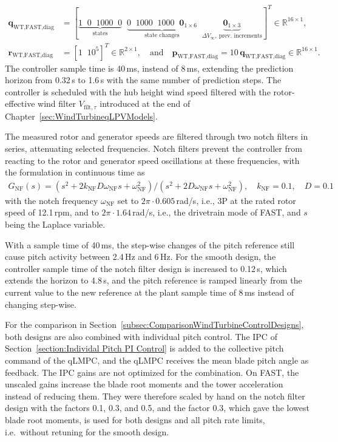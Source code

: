 \begin{align*}
    \bm{q}_{\text{WT,FAST,diag}} &= [\underbrace{1 \;\; 0 \;\; 1000 \;\; 0}_{\text{states}} \;\; \underbrace{0 \;\; 1000 \;\; 1000 \;\; \bm{0}_{1\times6}}_{\text{state changes}} \;\; \underbrace{\bm{0}_{1\times3}}_{\Delta V_\infty,\ \text{prev.\ increments}}]^T \in \mathbb{R}^{16 \times 1}, \\
    \bm{r}_{\text{WT,FAST,diag}} &= [1 \;\; 10^5]^T \in \mathbb{R}^{2 \times 1}, \quad \text{and}\quad
    \bm{p}_{\text{WT,FAST,diag}} = 10\, \bm{q}_{\text{WT,FAST,diag}} \in \mathbb{R}^{16 \times 1}.
\end{align*}
%
%
The controller sample time is 40\,ms, instead of 8\,ms, extending the prediction horizon from 0.32\,s to 1.6\,s with the same number of prediction steps. The controller is scheduled with the hub height wind speed filtered with the rotor-effective wind filter $V_{\text{filt},\tau}$ introduced at the end of Chapter~\ref{sec:WindTurbineqLPVModels}.


The measured rotor and generator speeds are filtered through two notch filters in series, attenuating selected frequencies. Notch filters prevent the controller from reacting to the rotor and generator speed oscillations at these frequencies, with the formulation in continuous time as
\begin{align*}
    G_\text{NF}(s) = (s^2 + 2k_\text{NF}D\omega_\text{NF}s + \omega_\text{NF}^2)/(s^2 + 2D\omega_\text{NF}s + \omega_\text{NF}^2), \quad k_\text{NF} = 0.1, \quad D = 0.1
\end{align*}
with the notch frequency $\omega_\text{NF}$ set to $2\pi \cdot 0.605$\,rad/s, i.e., 3P at the rated rotor speed of 12.1\,rpm, and to $2\pi \cdot 1.64$\,rad/s, i.e., the drivetrain mode of FAST, and $s$ being the Laplace variable.



With a sample time of 40\,ms, the step-wise changes of the pitch reference still cause pitch activity between 2.4\,Hz and 6\,Hz. For the smooth design, the controller sample time of the notch filter design is increased to 0.12\,s, which extends the horizon to 4.8\,s, and the pitch reference is ramped linearly from the current value to the new reference at the plant sample time of 8\,ms instead of changing step-wise.

For the comparison in Section~\ref{subsec:ComparisonWindTurbineControlDesigns}, both designs are also combined with individual pitch control. The IPC of Section~\ref{section:Individal Pitch PI Control} is added to the collective pitch command of the qLMPC, and the qLMPC receives the mean blade pitch angle as feedback. The IPC gains are not optimized for the combination. On FAST, the unscaled gains increase the blade root moments and the tower acceleration instead of reducing them. They were therefore scaled by hand on the notch filter design with the factors 0.1, 0.3, and 0.5, and the factor 0.3, which gave the lowest blade root moments, is used for both designs and all pitch rate limits, i.e.\ without retuning for the smooth design.


